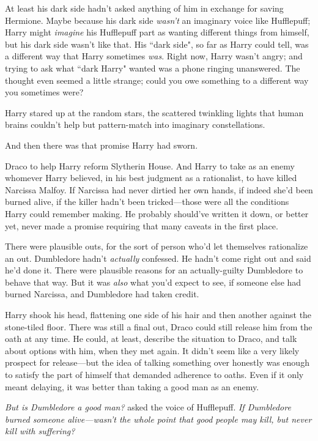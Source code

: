 At least his dark side hadn't asked anything of him in exchange for saving Hermione. Maybe because his dark side \emph{wasn't} an imaginary voice like Hufflepuff; Harry might \emph{imagine} his Hufflepuff part as wanting different things from himself, but his dark side wasn't like that. His ``dark side", so far as Harry could tell, was a different way that Harry sometimes \emph{was}. Right now, Harry wasn't angry; and trying to ask what ``dark Harry" wanted was a phone ringing unanswered. The thought even seemed a little strange; could you owe something to a different way you sometimes were?

Harry stared up at the random stars, the scattered twinkling lights that human brains couldn't help but pattern-match into imaginary constellations.

And then there was that promise Harry had sworn.

Draco to help Harry reform Slytherin House. And Harry to take as an enemy whomever Harry believed, in his best judgment as a rationalist, to have killed Narcissa Malfoy. If Narcissa had never dirtied her own hands, if indeed she'd been burned alive, if the killer hadn't been tricked—those were all the conditions Harry could remember making. He probably should've written it down, or better yet, never made a promise requiring that many caveats in the first place.

There were plausible outs, for the sort of person who'd let themselves rationalize an out. Dumbledore hadn't \emph{actually} confessed. He hadn't come right out and said he'd done it. There were plausible reasons for an actually-guilty Dumbledore to behave that way. But it was \emph{also} what you'd expect to see, if someone else had burned Narcissa, and Dumbledore had taken credit.

Harry shook his head, flattening one side of his hair and then another against the stone-tiled floor. There was still a final out, Draco could still release him from the oath at any time. He could, at least, describe the situation to Draco, and talk about options with him, when they met again. It didn't seem like a very likely prospect for release—but the idea of talking something over honestly was enough to satisfy the part of himself that demanded adherence to oaths. Even if it only meant delaying, it was better than taking a good man as an enemy.

\emph{But \emph{is} Dumbledore a good man?} asked the voice of Hufflepuff. \emph{If Dumbledore burned someone alive—wasn't the whole point that good people may kill, but never kill with suffering?}

